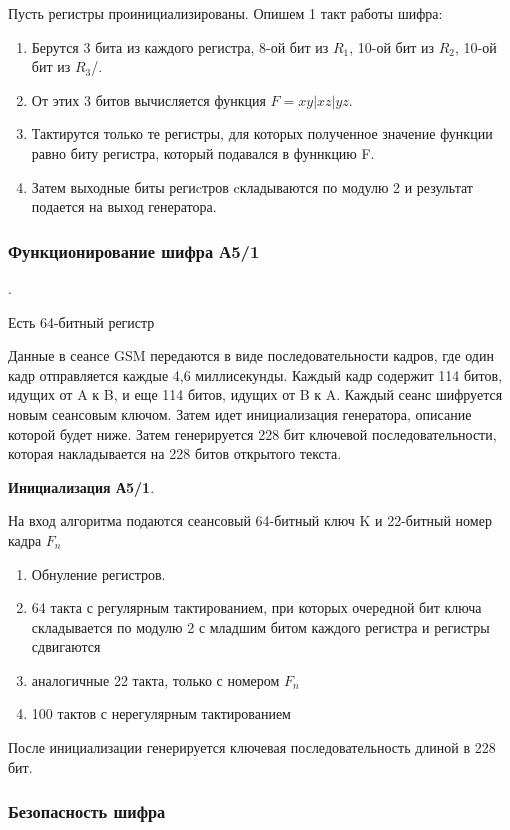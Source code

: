 \documentclass[colorthm]{./civarticle}
\begin{document}
Пусть регистры проинициализированы. Опишем 1 такт работы шифра:

\begin{enumerate}
        \item Берутся 3 бита из каждого регистра, 8-ой бит из $R_1$, 10-ой бит из $R_2$, 10-ой бит из $R_3$/.
        \item От этих 3 битов вычисляется функция $F=xy|xz|yz$.
        \item Тактирутся только те регистры, для которых полученное значение функции равно биту регистра, который подавался в фуннкцию F.
        \item Затем выходные биты региcтров cкладываются по модулю 2 и результат подается на выход генератора.
\end{enumerate}

\subsubsection{Функционирование шифра А5/1}.

Есть 64-битный регистр 

Данные в сеансе GSM передаются в виде последовательности кадров, где один кадр отправляется каждые 4,6 миллисекунды. Каждый кадр содержит 114 битов, идущих от A к B, и еще 114 битов, идущих от B к A. Каждый сеанс шифруется новым сеансовым ключом. Затем идет инициализация генератора, описание которой будет ниже. Затем генерируется 228 бит ключевой последовательности, которая накладывается на 228 битов открытого текста.

\textbf{Инициализация А5/1}.

На вход алгоритма подаются сеансовый 64-битный ключ K и 22-битный номер кадра $F_n$

\begin{enumerate}
        \item Обнуление регистров.
        \item 64 такта с регулярным тактированием, при которых очередной бит ключа складывается по модулю 2 с младшим битом каждого регистра и регистры сдвигаются
        \item аналогичные 22 такта, только с номером $F_n$
        \item 100 тактов с нерегулярным тактированием
\end{enumerate}

После инициализации генерируется ключевая последовательность длиной в 228 бит.

\subsubsection{Безопасность шифра} 
\end{document}
